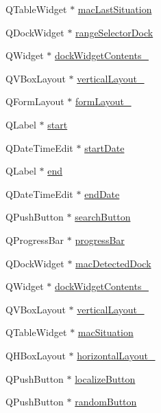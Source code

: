 \begin{DoxyCompactItemize}
\item 
Q\+Table\+Widget $\ast$ \hyperlink{class_ui___main_window_a99e8be1adac1710f3c59d5df305ebca4}{mac\+Last\+Situation}
\item 
Q\+Dock\+Widget $\ast$ \hyperlink{class_ui___main_window_a839a5c9ca2fb5c024adc5767778b330d}{range\+Selector\+Dock}
\item 
Q\+Widget $\ast$ \hyperlink{class_ui___main_window_a23b450a9debad2b0fecc6f063772caf2}{dock\+Widget\+Contents\+\_}
\item 
Q\+V\+Box\+Layout $\ast$ \hyperlink{class_ui___main_window_afb6bb8ab195766b2b18cee42bcdc246b}{vertical\+Layout\+\_}
\item 
Q\+Form\+Layout $\ast$ \hyperlink{class_ui___main_window_ace5f0a798745197334eea26efbfa4fa0}{form\+Layout\+\_}
\item 
Q\+Label $\ast$ \hyperlink{class_ui___main_window_a28b8b483f44efb79ad9251df493f8498}{start}
\item 
Q\+Date\+Time\+Edit $\ast$ \hyperlink{class_ui___main_window_a4c8ae23abc2547543c0254fa7a9628b6}{start\+Date}
\item 
Q\+Label $\ast$ \hyperlink{class_ui___main_window_a63a5783db7c64a047cde5511eb639db6}{end}
\item 
Q\+Date\+Time\+Edit $\ast$ \hyperlink{class_ui___main_window_afc29d830f83048a7114f77cce4b551cb}{end\+Date}
\item 
Q\+Push\+Button $\ast$ \hyperlink{class_ui___main_window_a8f6c525f90dbfcb49d03c52cb72eeabd}{search\+Button}
\item 
Q\+Progress\+Bar $\ast$ \hyperlink{class_ui___main_window_a21cff38a2f7c1fbae6334c65bc92dd65}{progress\+Bar}
\item 
Q\+Dock\+Widget $\ast$ \hyperlink{class_ui___main_window_ae18d32ebac64178b72bc93502bf20bc5}{mac\+Detected\+Dock}
\item 
Q\+Widget $\ast$ \hyperlink{class_ui___main_window_a557fa01d68067a564acc3d3aeba8690a}{dock\+Widget\+Contents\+\_}
\item 
Q\+V\+Box\+Layout $\ast$ \hyperlink{class_ui___main_window_ab35de77115e747d4efa5ecde01d9c16a}{vertical\+Layout\+\_}
\item 
Q\+Table\+Widget $\ast$ \hyperlink{class_ui___main_window_a692612136e2e02b34d3eee92657c019e}{mac\+Situation}
\item 
Q\+H\+Box\+Layout $\ast$ \hyperlink{class_ui___main_window_a03ce63974cc69b067c91bbf285cceca8}{horizontal\+Layout\+\_}
\item 
Q\+Push\+Button $\ast$ \hyperlink{class_ui___main_window_a114e860ca19559998d28856f5f677244}{localize\+Button}
\item 
Q\+Push\+Button $\ast$ \hyperlink{class_ui___main_window_a0c6076cf825b4dc110c62bc2b8908ce8}{random\+Button}
\end{DoxyCompactItemize}


